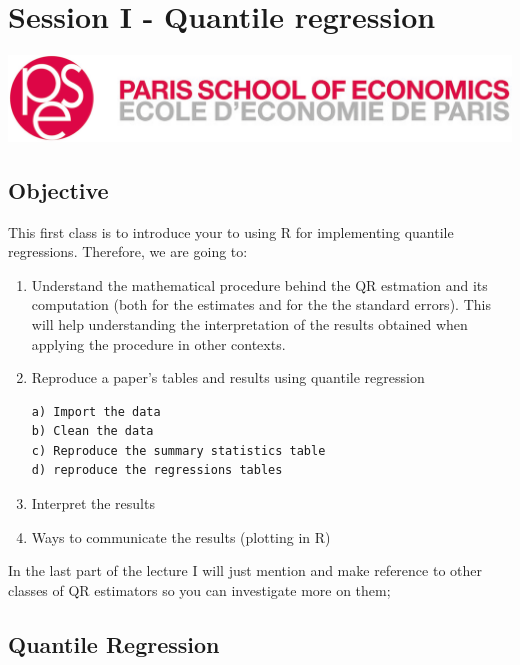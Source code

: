 \documentclass[]{book}
\begin{document}
\chapter{Session I - Quantile
regression}\label{session-i---quantile-regression}

\begin{center}\includegraphics[width=0.9\linewidth]{./images/1200px-Logo_pse_petit} \end{center}

\section{Objective}\label{objective-1}

This first class is to introduce your to using R for implementing
quantile regressions. Therefore, we are going to:

\begin{enumerate}
\def\labelenumi{\arabic{enumi}.}
\item
  Understand the mathematical procedure behind the QR estmation and its
  computation (both for the estimates and for the the standard errors).
  This will help understanding the interpretation of the results
  obtained when applying the procedure in other contexts.
\item
  Reproduce a paper's tables and results using quantile regression

\begin{verbatim}
a) Import the data
b) Clean the data
c) Reproduce the summary statistics table
d) reproduce the regressions tables
\end{verbatim}
\item
  Interpret the results
\item
  Ways to communicate the results (plotting in R)
\end{enumerate}

In the last part of the lecture I will just mention and make reference
to other classes of QR estimators so you can investigate more on them;

\section{Quantile Regression}\label{quantile-regression}
\end{document}
